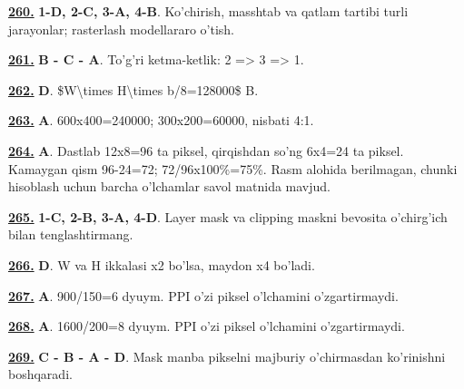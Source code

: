 \documentclass[10pt,a4paper,oneside]{article}
\begin{document}
\par\vspace{3mm}
\noindent\hyperlink{q260}{\textbf{260.}} \textbf{1-D, 2-C, 3-A, 4-B}.  Ko'chirish, masshtab va qatlam tartibi turli jarayonlar; rasterlash modellararo o'tish.
\par\vspace{3mm}
\noindent\hyperlink{q261}{\textbf{261.}} \textbf{B - C - A}.  To'g'ri ketma-ketlik: 2 =\textgreater{} 3 =\textgreater{} 1.
\par\vspace{3mm}
\noindent\hyperlink{q262}{\textbf{262.}} \textbf{D}.  \$W\textbackslash{}times H\textbackslash{}times b/8=128000\$ B.
\par\vspace{3mm}
\noindent\hyperlink{q263}{\textbf{263.}} \textbf{A}.  600x400=240000; 300x200=60000, nisbati 4:1.
\par\vspace{3mm}
\noindent\hyperlink{q264}{\textbf{264.}} \textbf{A}.  Dastlab 12x8=96 ta piksel, qirqishdan so'ng 6x4=24 ta piksel. Kamaygan qism 96-24=72; 72/96x100\%=75\%. Rasm alohida berilmagan, chunki hisoblash uchun barcha o'lchamlar savol matnida mavjud.
\par\vspace{3mm}
\noindent\hyperlink{q265}{\textbf{265.}} \textbf{1-C, 2-B, 3-A, 4-D}.  Layer mask va clipping maskni bevosita o'chirg'ich bilan tenglashtirmang.
\par\vspace{3mm}
\noindent\hyperlink{q266}{\textbf{266.}} \textbf{D}.  W va H ikkalasi x2 bo'lsa, maydon x4 bo'ladi.
\par\vspace{3mm}
\noindent\hyperlink{q267}{\textbf{267.}} \textbf{A}.  900/150=6 dyuym. PPI o'zi piksel o'lchamini o'zgartirmaydi.
\par\vspace{3mm}
\noindent\hyperlink{q268}{\textbf{268.}} \textbf{A}.  1600/200=8 dyuym. PPI o'zi piksel o'lchamini o'zgartirmaydi.
\par\vspace{3mm}
\noindent\hyperlink{q269}{\textbf{269.}} \textbf{C - B - A - D}.  Mask manba pikselni majburiy o'chirmasdan ko'rinishni boshqaradi.
\par\vspace{3mm}
\end{document}
